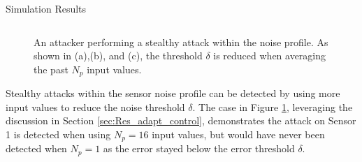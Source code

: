 \begin{section}{Simulation Results}
\begin{figure}
\begin{tabular}{cc}
\end{tabular}
\caption{An attacker performing a stealthy attack within the noise profile. As shown in (a),(b), and (c), the threshold $\delta$ is reduced when averaging the past $N_p$ input values. }

\label{fig:Stealthy_Attack}
\end{figure}

Stealthy attacks within the sensor noise profile can be detected by using more input values to reduce the noise threshold $\delta$. The case in Figure \ref{fig:Stealthy_Attack}, leveraging the discussion in Section \ref{sec:Res_adapt_control}, demonstrates the attack on Sensor 1 is detected when using $N_p=16$ input values, but would have never been detected when $N_p=1$ as the error stayed below the error threshold $\delta$.


\end{section}
